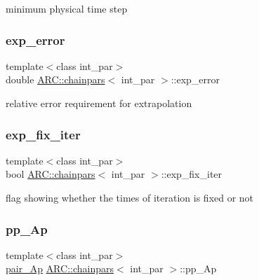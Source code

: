 minimum physical time step 

\hypertarget{classARC_1_1chainpars_acd51cb7131052b15b230c235e4647360}{}\label{classARC_1_1chainpars_acd51cb7131052b15b230c235e4647360} 
\subsubsection{\texorpdfstring{exp\+\_\+error}{exp\_error}}
{\footnotesize\ttfamily template$<$class int\+\_\+par$>$ \\
double \hyperlink{classARC_1_1chainpars}{A\+R\+C\+::chainpars}$<$ int\+\_\+par $>$\+::exp\+\_\+error}



relative error requirement for extrapolation 

\hypertarget{classARC_1_1chainpars_a90a606b468790eb9d60ee90d7f233961}{}\label{classARC_1_1chainpars_a90a606b468790eb9d60ee90d7f233961} 
\subsubsection{\texorpdfstring{exp\+\_\+fix\+\_\+iter}{exp\_fix\_iter}}
{\footnotesize\ttfamily template$<$class int\+\_\+par$>$ \\
bool \hyperlink{classARC_1_1chainpars}{A\+R\+C\+::chainpars}$<$ int\+\_\+par $>$\+::exp\+\_\+fix\+\_\+iter}



flag showing whether the times of iteration is fixed or not 

\hypertarget{classARC_1_1chainpars_a7a12864e60dfa03ff5a258cf0eb472e8}{}\label{classARC_1_1chainpars_a7a12864e60dfa03ff5a258cf0eb472e8} 
\subsubsection{\texorpdfstring{pp\+\_\+\+Ap}{pp\_Ap}}
{\footnotesize\ttfamily template$<$class int\+\_\+par$>$ \\
\hyperlink{classARC_1_1chainpars_a80fcc6e3b5ce69025126bc49d90f233c}{pair\+\_\+\+Ap} \hyperlink{classARC_1_1chainpars}{A\+R\+C\+::chainpars}$<$ int\+\_\+par $>$\+::pp\+\_\+\+Ap}



